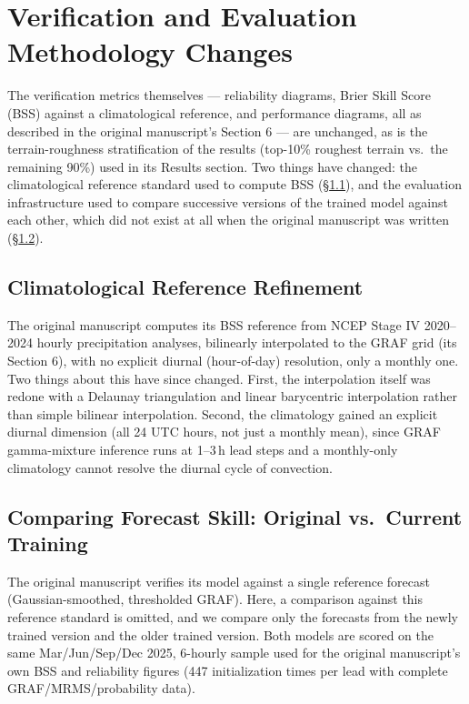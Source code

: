 \documentclass[11pt]{article}
\begin{document}
\section{Verification and Evaluation Methodology Changes}
\label{sec:verification}

The verification metrics themselves --- reliability diagrams, Brier
Skill Score (BSS) against a climatological reference, and performance
diagrams, all as described in the original manuscript's Section 6 ---
are unchanged, as is the terrain-roughness stratification of the results
 (top-10\% roughest terrain vs.\ the remaining 90\%) used
in its Results section. Two things have changed: the climatological
reference standard used to compute BSS (\S\ref{sec:verification-climo}),
and the evaluation infrastructure used to compare successive versions
of the trained model against each other, which did not exist at all
when the original manuscript was written
(\S\ref{sec:verification-crosscheck}).

\subsection{Climatological Reference Refinement}
\label{sec:verification-climo}

The original manuscript computes its BSS reference from NCEP Stage IV
2020--2024 hourly precipitation analyses, bilinearly interpolated to
the GRAF grid (its Section 6), with no explicit
diurnal (hour-of-day) resolution, only a monthly one. Two things about
this have since changed. First, the interpolation itself was redone
with a Delaunay triangulation and linear barycentric interpolation
rather than simple bilinear interpolation.  Second, the climatology gained
an explicit diurnal dimension (all 24 UTC hours, not just a monthly
mean), since GRAF gamma-mixture inference runs at 1--3\,h lead
steps and a monthly-only climatology cannot resolve the diurnal cycle
of convection.

\subsection{Comparing Forecast Skill: Original vs.\ Current Training}
\label{sec:verification-crosscheck}

The original manuscript verifies its model against a single reference
forecast (Gaussian-smoothed, thresholded GRAF).  Here, a 
comparison against this reference standard is omitted, and we compare
only the forecasts from the newly trained version and the older trained version.
Both models are scored on the same Mar/Jun/Sep/Dec 2025,
6-hourly sample used for the original manuscript's own BSS and
reliability figures (447 initialization times per lead with complete
GRAF/MRMS/probability data).
\end{document}

